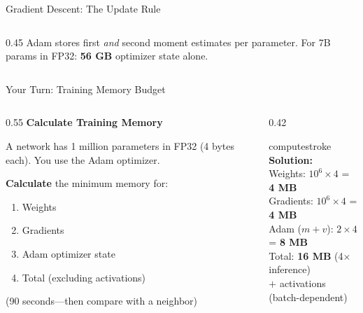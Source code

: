 \documentclass[aspectratio=169, 12pt]{beamer}
\begin{document}
\begin{frame}{Gradient Descent: The Update Rule}
\begin{columns}[T]
\begin{column}{0.45\textwidth}
    \vspace{0.15cm}
    {\footnotesize Adam stores first \emph{and} second moment estimates per parameter. For 7B params in FP32: \textbf{56 GB} optimizer state alone.}
  \end{column}
\end{columns}

\end{frame}

\begin{frame}{Your Turn: Training Memory Budget}

\footnotesize
\begin{columns}[T]
  \begin{column}{0.55\textwidth}
    {\small\bfseries Calculate Training Memory}

    \vspace{0.15cm}
    A network has 1 million parameters in FP32 (4 bytes each). You use the Adam optimizer.

    \vspace{0.1cm}
    \textbf{Calculate} the minimum memory for:
    \begin{enumerate}\setlength\itemsep{0pt}
      \item Weights
      \item Gradients
      \item Adam optimizer state
      \item Total (excluding activations)
    \end{enumerate}

    {\footnotesize\textcolor{midgray}{(90 seconds---then compare with a neighbor)}}
  \end{column}
  \begin{column}{0.42\textwidth}
    \pause
    \begin{mlsyscard}{computestroke}
    \textbf{Solution:}\\[0.05cm]
    {\footnotesize
    Weights: $10^6 \times 4$ = \textbf{4 MB}\\
    Gradients: $10^6 \times 4$ = \textbf{4 MB}\\
    Adam ($m + v$): $2 \times 4$ = \textbf{8 MB}\\[0.05cm]
    Total: \textbf{16 MB} (4$\times$ inference)\\[0.05cm]
    \textcolor{computestroke}{$+$ activations (batch-dependent)}
    }
    \end{mlsyscard}
  \end{column}
\end{columns}

\end{frame}
\end{document}
